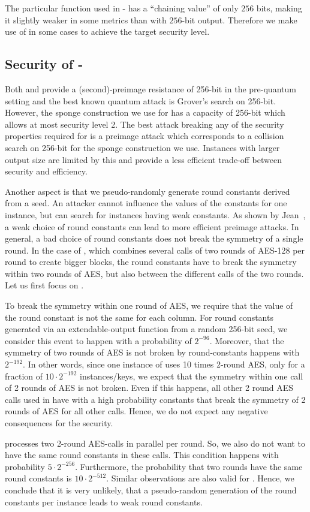 The particular function \shatwofs used in \spx-\shatwo
has a ``chaining value'' of only $256$ bits,
making it slightly weaker in some metrics
than \shaketfs with $256$-bit output.
Therefore we make use of \shatwofivetwelve in some cases to achieve the target security level.


\subsection{Security of \spx-\haraka}
Both  and  provide a (second)-preimage
resistance of 256-bit in the pre-quantum setting and the best known quantum attack
is Grover's search on 256-bit. However, the sponge construction we use for
\harakasponge has a capacity of 256-bit which allows at most security level 2.
The best attack breaking any of the security properties required for \spx is a
preimage attack which corresponds to a collision search on 256-bit for the
sponge construction we use.
Instances with larger output size are limited by this
and provide a less efficient trade-off between security and efficiency.

Another aspect is that we pseudo-randomly generate round constants derived
from a seed. An attacker cannot influence the values of the constants
for one instance, but can search for instances having weak constants. As shown by
Jean~\cite{toscJean16}, a weak choice of round constants can lead to more efficient
preimage attacks. In general, a bad choice of round constants does not break the
symmetry of a single round. In the case of \haraka, which combines several
calls of two rounds of AES-128 per round to create bigger blocks, the round
constants have to break the symmetry within two rounds of AES, but also
between the different calls of the two rounds. Let us first focus on
.

To break the symmetry within one round of AES, we require that the value of the
round constant is not the same for each column. For round constants generated
via an extendable-output function from a random 256-bit seed, we consider
this event to happen with a probability of $2^{-96}$. Moreover, that the
symmetry of two rounds of AES is not broken by round-constants happens with
$2^{-192}$. In other words, since one instance of  uses 10 times
2-round AES, only for a fraction of $10\cdot2^{-192}$ instances/keys,
we expect that the symmetry within one call of 2 rounds of AES is not broken.
Even if this happens, all other 2 round AES calls used in 
have with a high probability constants that break the symmetry of 2 rounds of
AES for all other calls. Hence, we do not expect any negative consequences for
the security.

 processes two 2-round AES-calls in parallel per round. So,
we also do not want to have the same round constants in these calls.
This condition happens with probability $5\cdot2^{-256}$. Furthermore,
the probability that two rounds have the same round constants
is $10\cdot2^{-512}$. Similar observations are also valid for .
Hence, we conclude that it is very unlikely, that a pseudo-random generation of
the round constants per instance leads to weak round constants.
